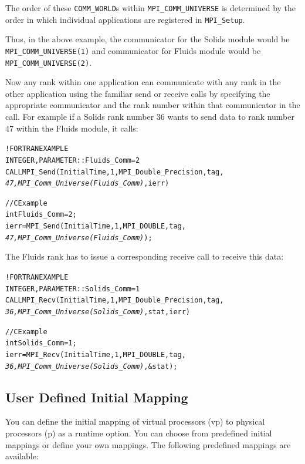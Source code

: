 \documentclass[10pt]{article}
\begin{document}
The order of these \texttt{COMM\_WORLD}s within \texttt{MPI\_COMM\_UNIVERSE}
is determined by the order in which individual applications are registered in
\texttt{MPI\_Setup}.

Thus, in the above example, the communicator for the Solids module would be
\texttt{MPI\_COMM\_UNIVERSE(1)} and communicator for Fluids module would be
\texttt{MPI\_COMM\_UNIVERSE(2)}.

Now any rank within one application can communicate with any rank in the
other application using the familiar send or receive \ampi{} calls by
specifying the appropriate communicator and the rank number within that
communicator in the call. For example if a Solids rank number 36 wants to send
data to rank number 47 within the Fluids module, it calls:

\begin{alltt}
!FORTRAN EXAMPLE
INTEGER , PARAMETER :: Fluids_Comm = 2
CALL MPI_Send(InitialTime, 1, MPI_Double_Precision, tag, 
              \emph{47, MPI_Comm_Universe(Fluids_Comm)}, ierr)

//C Example
int Fluids_Comm = 2;
ierr = MPI_Send(InitialTime, 1, MPI_DOUBLE, tag,
                \emph{47, MPI_Comm_Universe(Fluids_Comm)});
\end{alltt}

The Fluids rank has to issue a corresponding receive call to receive this
data:

\begin{alltt}
!FORTRAN EXAMPLE
INTEGER , PARAMETER :: Solids_Comm = 1
CALL MPI_Recv(InitialTime, 1, MPI_Double_Precision, tag, 
              \emph{36, MPI_Comm_Universe(Solids_Comm)}, stat, ierr)

//C Example
int Solids_Comm = 1;
ierr = MPI_Recv(InitialTime, 1, MPI_DOUBLE, tag,
                \emph{36, MPI_Comm_Universe(Solids_Comm)}, &stat);
\end{alltt}

\subsection{User Defined Initial Mapping}
                                                                                
You can define the initial mapping of virtual processors (vp) to physical
processors (p) as a runtime option. You can choose from predefined initial
mappings or define your own mappings. The following predefined mappings are
available:
                                                                                
\end{document}
